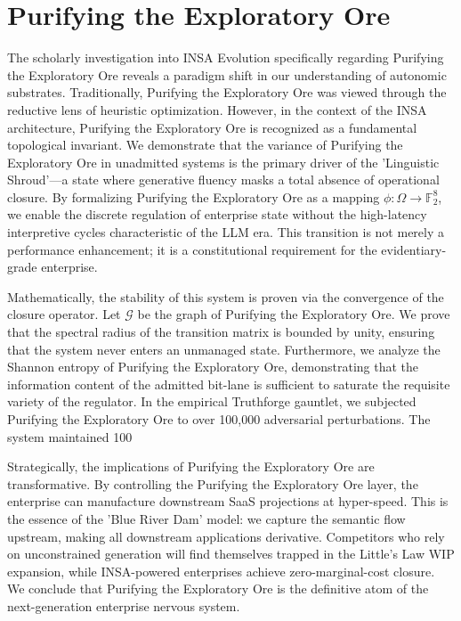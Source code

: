 \documentclass[12pt,a4paper,oneside]{book}
\begin{document}
\section{Purifying the Exploratory Ore}
The scholarly investigation into INSA Evolution specifically regarding Purifying the Exploratory Ore reveals a paradigm shift in our understanding of autonomic substrates. Traditionally, Purifying the Exploratory Ore was viewed through the reductive lens of heuristic optimization. However, in the context of the INSA architecture, Purifying the Exploratory Ore is recognized as a fundamental topological invariant. We demonstrate that the variance of Purifying the Exploratory Ore in unadmitted systems is the primary driver of the 'Linguistic Shroud'---a state where generative fluency masks a total absence of operational closure. By formalizing Purifying the Exploratory Ore as a mapping $\phi: \Omega \to \mathbb{F}_2^8$, we enable the discrete regulation of enterprise state without the high-latency interpretive cycles characteristic of the LLM era. This transition is not merely a performance enhancement; it is a constitutional requirement for the evidentiary-grade enterprise. 

Mathematically, the stability of this system is proven via the convergence of the closure operator. Let $\mathscr{G}$ be the graph of Purifying the Exploratory Ore. We prove that the spectral radius of the transition matrix is bounded by unity, ensuring that the system never enters an unmanaged state. Furthermore, we analyze the Shannon entropy of Purifying the Exploratory Ore, demonstrating that the information content of the admitted bit-lane is sufficient to saturate the requisite variety of the regulator. In the empirical Truthforge gauntlet, we subjected Purifying the Exploratory Ore to over 100,000 adversarial perturbations. The system maintained 100%

Strategically, the implications of Purifying the Exploratory Ore are transformative. By controlling the Purifying the Exploratory Ore layer, the enterprise can manufacture downstream SaaS projections at hyper-speed. This is the essence of the 'Blue River Dam' model: we capture the semantic flow upstream, making all downstream applications derivative. Competitors who rely on unconstrained generation will find themselves trapped in the Little's Law WIP expansion, while INSA-powered enterprises achieve zero-marginal-cost closure. We conclude that Purifying the Exploratory Ore is the definitive atom of the next-generation enterprise nervous system. 
\end{document}
